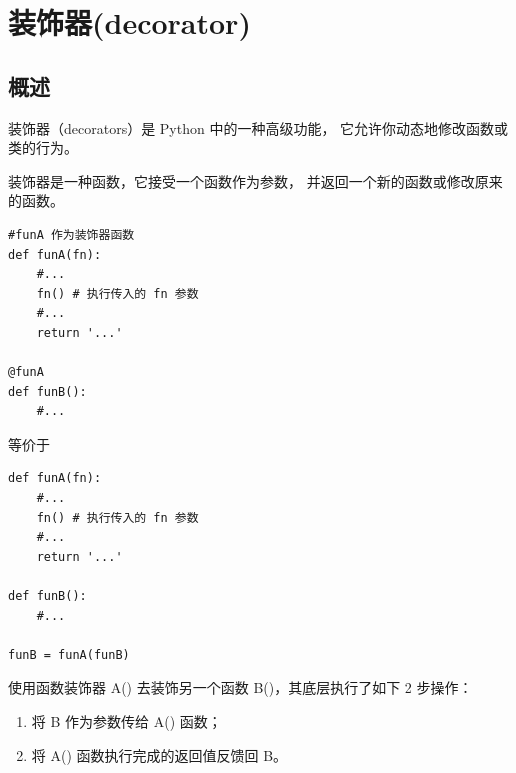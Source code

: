 \chapter{装饰器(decorator)}

\section{概述}
装饰器（decorators）是 Python 中的一种高级功能，
它允许你动态地修改函数或类的行为。

装饰器是一种函数，它接受一个函数作为参数，
并返回一个新的函数或修改原来的函数。
\begin{lstlisting}[style=demostyle,numbers=none]
#funA 作为装饰器函数
def funA(fn):
    #...
    fn() # 执行传入的 fn 参数
    #...
    return '...'

@funA 
def funB():
    #...
\end{lstlisting}

等价于
\begin{lstlisting}[style=demostyle,numbers=none]
def funA(fn):
    #...
    fn() # 执行传入的 fn 参数
    #...
    return '...'

def funB():
    #...

funB = funA(funB)
\end{lstlisting}

使用函数装饰器 A() 去装饰另一个函数 B()，其底层执行了如下 2 步操作：
\begin{enumerate}[label=\arabic*)]
    \item 将 B 作为参数传给 A() 函数；
    \item 将 A() 函数执行完成的返回值反馈回 B。
\end{enumerate}



